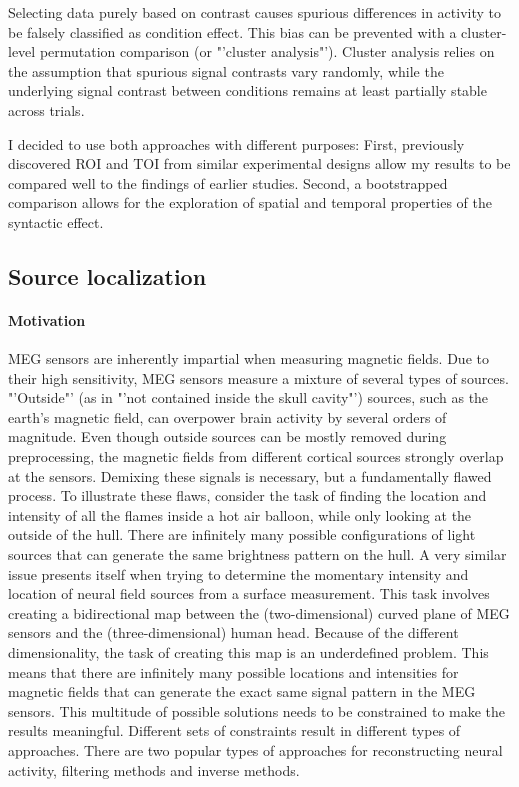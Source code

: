 Selecting data purely based on contrast causes spurious differences in activity to be falsely classified as condition effect.
This bias can be prevented with a cluster-level permutation comparison (or "'cluster analysis"').
Cluster analysis relies on the assumption that spurious signal contrasts vary randomly, while the underlying signal contrast between conditions remains at least partially stable across trials.

I decided to use both approaches with different purposes:
First, previously discovered ROI and TOI from similar experimental designs allow my results to be compared well to the findings of earlier studies.
Second, a bootstrapped comparison allows for the exploration of spatial and temporal properties of the syntactic effect.

\subsection{Source localization}

\paragraph{Motivation}
MEG sensors are inherently impartial when measuring magnetic fields.
Due to their high sensitivity, MEG sensors measure a mixture of several types of sources.
"'Outside"' (as in "'not contained inside the skull cavity"') sources, such as the earth's magnetic field, can overpower brain activity by several orders of magnitude.
Even though outside sources can be mostly removed during preprocessing, the magnetic fields from different cortical sources strongly overlap at the sensors.
Demixing these signals is necessary, but a fundamentally flawed process.
To illustrate these flaws, consider the task of finding the location and intensity of all the flames inside a hot air balloon, while only looking at the outside of the hull.
There are infinitely many possible configurations of light sources that can generate the same brightness pattern on the hull.
A very similar issue presents itself when trying to determine the momentary intensity and location of neural field sources from a surface measurement.
This task involves creating a bidirectional map between the (two-dimensional) curved plane of MEG sensors and the (three-dimensional) human head.
Because of the different dimensionality, the task of creating this map is an underdefined problem.
This means that there are infinitely many possible locations and intensities for magnetic fields that can generate the exact same signal pattern in the MEG sensors.
This multitude of possible solutions needs to be constrained to make the results meaningful.
Different sets of constraints result in different types of approaches.
There are two popular types of approaches for reconstructing neural activity, filtering methods and inverse methods.

